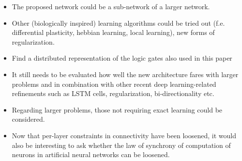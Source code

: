 \documentclass{article}
\begin{document}
\begin{itemize}
    \item The proposed network could be a sub-network of a larger network.
    \item Other (biologically inspired) learning algorithms could be tried out (f.e. differential plasticity, hebbian learning, local learning), new forms of regularization.
    \item Find a distributed representation of the logic gates also used in this paper
    \item It still needs to be evaluated how well the new architecture fares with larger problems and in combination with other recent deep learning-related refinements such as LSTM cells, regularization, bi-directionality etc.
    \item Regarding larger problems, those not requiring exact learning could be considered.
    \item Now that per-layer constraints in connectivity have been loosened, it would also be interesting to ask whether the law of synchrony of computation of neurons in artificial neural networks can be loosened.
\end{itemize}












\end{document}
